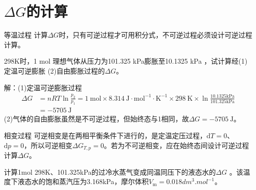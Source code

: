 \section{\texorpdfstring{$\Delta G$}.的计算}


\begin{frame}{等温过程}
    计算$\Delta G$时，只有可逆过程才可用积分式，不可逆过程必须设计可逆过程计算。
    \begin{example}
    298K时，1 mol 理想气体从压力为101.325 kPa膨胀至10.1325 kPa ，试计算经(1)定温可逆膨胀 (2)自由膨胀过程的$\Delta G$。
    \end{example}
    \pause
    解：(1)定温可逆膨胀过程
    $$\begin{aligned}
        \Delta G &=n R T \ln \frac{p_{2}}{p_{1}}=1 \mathrm{~mol} \times 8.314 \mathrm{~J} \cdot \mathrm{mol}^{-1} \cdot \mathrm{K}^{-1} \times 298 \mathrm{~K} \times \ln \frac{10.1325 \mathrm{kPa}}{101.325 \mathrm{kPa}} \\
        &=-5705 \mathrm{~J}
    \end{aligned}$$
    (2)气体的自由膨胀虽然是不可逆过程，但始终态与1相同，故$\Delta G=-5705 \mathrm{~J}$。
\end{frame}


\begin{frame}{相变过程}
    可逆相变是在两相平衡条件下进行的，是定温定压过程，$\mathrm{d}T=0$、$\mathrm{d}p=0$，所以可逆相变$\Delta G_{T,p}=0$。若为不可逆相变，应在始终态间设计可逆过程计算$\Delta G$。
    \begin{example}
        计算1mol 298K、101.325kPa的过冷水蒸气变成同温同压下的液态水的$\Delta G$ 。该温度下液态水的饱和蒸汽压为3.168kPa，摩尔体积$V_\mathrm{m} = 0.018 \si{dm^3.mol^{-1}}$。
    \end{example}
    \pause
    \begin{center}
    \end{center}
\end{frame}


